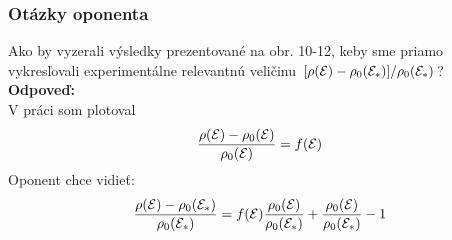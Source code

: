 \documentclass[
	11pt, %
]{beamer}
\begin{document}
\begin{frame}
\begin{figure}
    \vspace{-10mm}
    \label{fig:example}%
\end{figure}
\end{frame}
\begin{frame}
\frametitle{Otázky oponenta}

Ako by vyzerali výsledky prezentované na obr. 10-12, keby sme priamo vykresľovali
experimentálne relevantnú veličinu $[\rho(\mathcal{E})-\rho_0(\mathcal{E}_*)]/\rho_0(\mathcal{E}_*)$?
\vspace{5mm}
\textbf{Odpoveď:}\\
V práci som plotoval
$$\frac{\rho(\mathcal{E})-\rho_0(\mathcal{E})}{\rho_0(\mathcal{E})}=f(\mathcal{E})$$
Oponent chce vidieť:
$$\frac{\rho(\mathcal{E})-\rho_0(\mathcal{E}_*)}{\rho_0(\mathcal{E}_*)} = f(\mathcal{E})\frac{\rho_0(\mathcal{E})}{\rho_0(\mathcal{E}_*)}+\frac{\rho_0(\mathcal{E})}{\rho_0(\mathcal{E}_*)} - 1$$
\end{frame}
\end{document}
